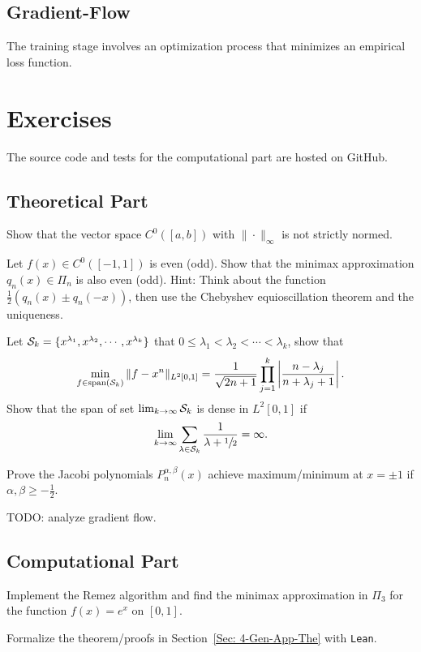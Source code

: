 \subsection{Gradient-Flow}
The training stage involves an optimization process that minimizes an empirical loss function.
\section{Exercises}
The source code and tests for the computational part are hosted on GitHub.
\subsection{Theoretical Part}
\begin{problem}
    Show that the vector space $C^0([a, b])$ with $\|\cdot\|_{\infty}$ is not strictly normed.
\end{problem}
\begin{problem}
    Let $f(x)\in C^0([-1,1])$ is even (odd). Show that the minimax approximation $q_n(x)\in\Pi_n$ is also even (odd).
    Hint: Think about the function $\frac{1}{2}(q_n(x) \pm q_n(-x))$, then use the Chebyshev equioscillation theorem and the uniqueness.
\end{problem}
\begin{problem}
    Let $\mathcal S_k = \{x^{\lambda_1}, x^{\lambda_2}, \cdots, x^{\lambda_k}\}$ that $0\le \lambda_1 < \lambda_2 < \cdots < \lambda_k$, show that 
    \begin{equation}\nonumber
        \min_{f\in \textrm{span}(\mathcal S_k)} \|f - x^{n}\|_{L^2[0, 1]} = \frac{1}{\sqrt{2n+1}}\prod_{j=1}^k\left|\frac{n - \lambda_j}{n + \lambda_j + 1}\right|.
    \end{equation}
    Show that the span of set $\lim_{k\to\infty}\mathcal S_k$ is dense in $L^2[0, 1]$ if 
    \begin{equation}
      \lim_{k\to\infty}  \sum_{\lambda\in \mathcal S_k} \frac{1}{\lambda+\sfrac{1}{2}} = \infty. 
    \end{equation}
\end{problem}
\begin{problem}
    Prove the Jacobi polynomials $P_n^{\alpha, \beta}(x)$ achieve maximum/minimum at $x= \pm 1$ if $\alpha, \beta \ge -\frac{1}{2}$.  
\end{problem}

\begin{problem}
    TODO: analyze gradient flow.
\end{problem}
\subsection{Computational Part}
\begin{problem}
    Implement the Remez algorithm and find the minimax approximation in $\Pi_3$ for the function $f(x) = e^x$ on $[0, 1]$.
\end{problem}

\begin{problem}
    Formalize the theorem/proofs in Section~\ref{Sec: 4-Gen-App-The} with \texttt{Lean}.
\end{problem}

\nocite{trefethen2019approximation,cheney2009course, muskhelishvili2008singular, elliott1974asymptotic}


